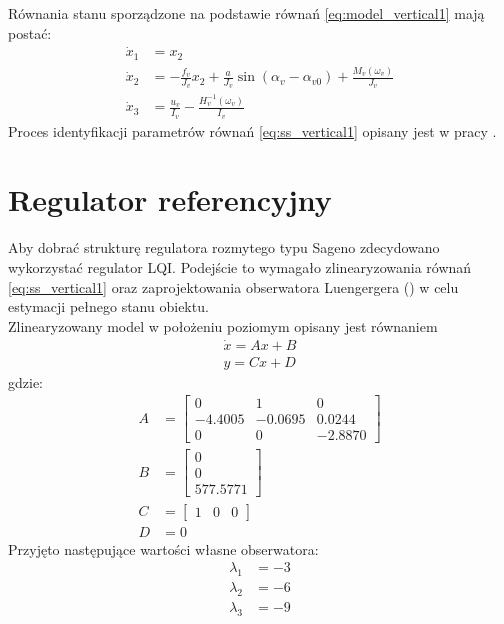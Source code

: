 %
Równania stanu sporządzone na podstawie równań \ref{eq:model_vertical1} mają postać:
\begin{equation}
\begin{aligned}
\dot x_1 &= x_2\\
\dot x_2 &= -\frac{f_v}{J_v}x_2+\frac{a}{J_v}\sin (\alpha_v-\alpha_{v0})+\frac{M_v(\omega_v)}{J_v}\\
\dot x_3 &= \frac{u_v}{I_v}-\frac{H_v^{-1}(\omega_v)}{I_v}
\end{aligned}
\label{eq:ss_vertical1}
\end{equation}
%
Proces identyfikacji parametrów równań \ref{eq:ss_vertical1} opisany jest w pracy \cite{LP}.

\section{Regulator referencyjny}
Aby dobrać strukturę regulatora rozmytego typu Sageno zdecydowano wykorzystać regulator LQI. Podejście to wymagało zlinearyzowania równań \ref{eq:ss_vertical1} oraz zaprojektowania obserwatora Luengergera (\cite{LP}) w celu estymacji pełnego stanu obiektu.\\ 
Zlinearyzowany model w położeniu poziomym opisany jest równaniem 
\begin{equation}\label{key}
\begin{aligned}
\dot x = Ax + B \\
y = Cx + D
\end{aligned}
\end{equation}
gdzie:
\begin{equation}
\begin{aligned}
A &=
\begin{bmatrix}
0 & 1 & 0\\
-4.4005 & -0.0695 & 0.0244\\
0 & 0 & -2.8870
\end{bmatrix}\\
B &=
\begin{bmatrix}
0\\
0\\
577.5771
\end{bmatrix}\\
C &=
\begin{bmatrix}
1 & 0 & 0
\end{bmatrix}\\
D &= 0
\end{aligned}
\end{equation} 
Przyjęto następujące wartości własne obserwatora:
\begin{equation}
\begin{aligned}
\lambda_1 &= -3\\
\lambda_2 &= -6\\
\lambda_3 &= -9
\end{aligned}
\end{equation}
